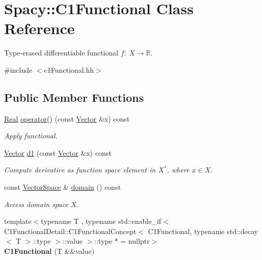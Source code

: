 \hypertarget{classSpacy_1_1C1Functional}{}\section{Spacy\+:\+:C1\+Functional Class Reference}
\label{classSpacy_1_1C1Functional}


Type-\/erased differentiable functional $f:\ X \to \mathbb{R} $.  




{\ttfamily \#include $<$c1\+Functional.\+hh$>$}

\subsection*{Public Member Functions}
\begin{DoxyCompactItemize}
\item 
\hyperlink{classSpacy_1_1Real}{Real} \hyperlink{classSpacy_1_1C1Functional_a621b710f0c8c583d074f4bf4da3cbb09}{operator()} (const \hyperlink{classSpacy_1_1Vector}{Vector} \&x) const \hypertarget{classSpacy_1_1C1Functional_a621b710f0c8c583d074f4bf4da3cbb09}{}\label{classSpacy_1_1C1Functional_a621b710f0c8c583d074f4bf4da3cbb09}

\begin{DoxyCompactList}\small\item\em Apply functional. \end{DoxyCompactList}\item 
\hyperlink{classSpacy_1_1Vector}{Vector} \hyperlink{classSpacy_1_1C1Functional_a5953291c58bf20e87ab2bfe26231fe49}{d1} (const \hyperlink{classSpacy_1_1Vector}{Vector} \&x) const \hypertarget{classSpacy_1_1C1Functional_a5953291c58bf20e87ab2bfe26231fe49}{}\label{classSpacy_1_1C1Functional_a5953291c58bf20e87ab2bfe26231fe49}

\begin{DoxyCompactList}\small\item\em Compute derivative as function space element in $X^*$, where $x\in X$. \end{DoxyCompactList}\item 
const \hyperlink{classSpacy_1_1VectorSpace}{Vector\+Space} \& \hyperlink{classSpacy_1_1C1Functional_a3ec8df7e7998b557445c907cbd8e80b8}{domain} () const \hypertarget{classSpacy_1_1C1Functional_a3ec8df7e7998b557445c907cbd8e80b8}{}\label{classSpacy_1_1C1Functional_a3ec8df7e7998b557445c907cbd8e80b8}

\begin{DoxyCompactList}\small\item\em Access domain space $X$. \end{DoxyCompactList}\item 
{\footnotesize template$<$typename T , typename std\+::enable\+\_\+if$<$ C1\+Functional\+Detail\+::\+C1\+Functional\+Concept$<$ C1\+Functional, typename std\+::decay$<$ T $>$\+::type $>$\+::value $>$\+::type $\ast$  = nullptr$>$ }\\{\bfseries C1\+Functional} (T \&\&value)\hypertarget{classSpacy_1_1C1Functional_ada8999210df700c93ee7d7c35bdabebc}{}\label{classSpacy_1_1C1Functional_ada8999210df700c93ee7d7c35bdabebc}


\end{DoxyCompactItemize}
